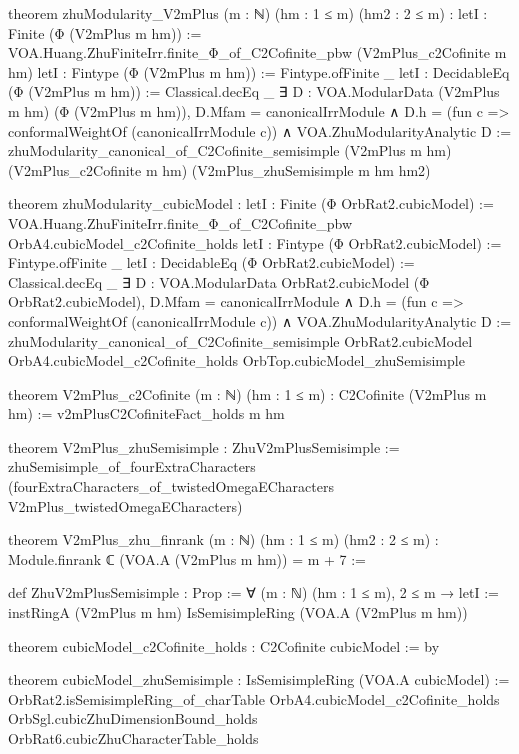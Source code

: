 \documentclass[11pt,openany]{book}
\theoremstyle{definition}
\theoremstyle{plain}
\begin{document}
\begin{leancode}
theorem zhuModularity_V2mPlus (m : ℕ) (hm : 1 ≤ m) (hm2 : 2 ≤ m) :
    letI : Finite (Φ (V2mPlus m hm)) :=
      VOA.Huang.ZhuFiniteIrr.finite_Φ_of_C2Cofinite_pbw (V2mPlus_c2Cofinite m hm)
    letI : Fintype (Φ (V2mPlus m hm)) := Fintype.ofFinite _
    letI : DecidableEq (Φ (V2mPlus m hm)) := Classical.decEq _
    ∃ D : VOA.ModularData (V2mPlus m hm) (Φ (V2mPlus m hm)), D.Mfam = canonicalIrrModule ∧
      D.h = (fun c => conformalWeightOf (canonicalIrrModule c)) ∧ VOA.ZhuModularityAnalytic D :=
  zhuModularity_canonical_of_C2Cofinite_semisimple (V2mPlus m hm) (V2mPlus_c2Cofinite m hm)
    (V2mPlus_zhuSemisimple m hm hm2)

theorem zhuModularity_cubicModel :
    letI : Finite (Φ OrbRat2.cubicModel) :=
      VOA.Huang.ZhuFiniteIrr.finite_Φ_of_C2Cofinite_pbw OrbA4.cubicModel_c2Cofinite_holds
    letI : Fintype (Φ OrbRat2.cubicModel) := Fintype.ofFinite _
    letI : DecidableEq (Φ OrbRat2.cubicModel) := Classical.decEq _
    ∃ D : VOA.ModularData OrbRat2.cubicModel (Φ OrbRat2.cubicModel),
      D.Mfam = canonicalIrrModule ∧
      D.h = (fun c => conformalWeightOf (canonicalIrrModule c)) ∧ VOA.ZhuModularityAnalytic D :=
  zhuModularity_canonical_of_C2Cofinite_semisimple OrbRat2.cubicModel
    OrbA4.cubicModel_c2Cofinite_holds OrbTop.cubicModel_zhuSemisimple
\end{leancode}
\begin{leancode}
theorem V2mPlus_c2Cofinite (m : ℕ) (hm : 1 ≤ m) : C2Cofinite (V2mPlus m hm) :=
  v2mPlusC2CofiniteFact_holds m hm

theorem V2mPlus_zhuSemisimple : ZhuV2mPlusSemisimple :=
  zhuSemisimple_of_fourExtraCharacters
    (fourExtraCharacters_of_twistedOmegaECharacters V2mPlus_twistedOmegaECharacters)

theorem V2mPlus_zhu_finrank (m : ℕ) (hm : 1 ≤ m) (hm2 : 2 ≤ m) :
    Module.finrank ℂ (VOA.A (V2mPlus m hm)) = m + 7 :=
\end{leancode}
\begin{leancode}
def ZhuV2mPlusSemisimple : Prop :=
  ∀ (m : ℕ) (hm : 1 ≤ m), 2 ≤ m →
    letI := instRingA (V2mPlus m hm)
    IsSemisimpleRing (VOA.A (V2mPlus m hm))
\end{leancode}
\begin{leancode}
theorem cubicModel_c2Cofinite_holds : C2Cofinite cubicModel := by

theorem cubicModel_zhuSemisimple : IsSemisimpleRing (VOA.A cubicModel) :=
  OrbRat2.isSemisimpleRing_of_charTable OrbA4.cubicModel_c2Cofinite_holds
    OrbSgl.cubicZhuDimensionBound_holds OrbRat6.cubicZhuCharacterTable_holds
\end{leancode}
\end{document}
